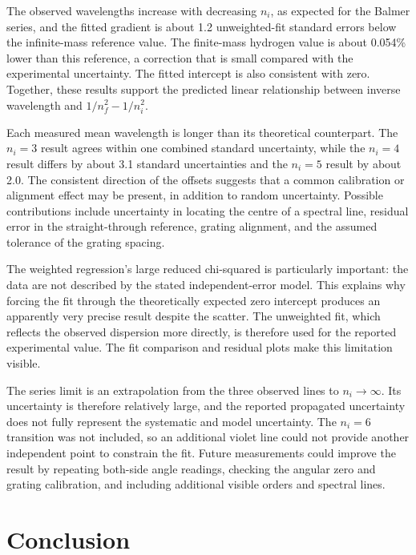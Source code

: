 \documentclass[12pt,a4paper]{article}
\begin{document}
The observed wavelengths increase with decreasing
$n_i$, as expected for the Balmer series, and the fitted
gradient is about 1.2 unweighted-fit standard errors below
the infinite-mass reference value. The finite-mass hydrogen
value is about 0.054\% lower than this reference, a correction
that is small compared with the experimental uncertainty.
The fitted intercept is also consistent with zero. Together,
these results support the predicted linear relationship
between inverse wavelength and
$1/n_f^2-1/n_i^2$.

Each measured mean wavelength is longer than its theoretical
counterpart. The $n_i=3$ result agrees within one combined
standard uncertainty, while the $n_i=4$ result differs by
about 3.1 standard uncertainties and the $n_i=5$ result by
about 2.0. The consistent direction of the offsets suggests
that a common calibration or alignment effect may be present,
in addition to random uncertainty. Possible contributions
include uncertainty in locating the centre of a spectral
line, residual error in the straight-through reference,
grating alignment, and the assumed tolerance of the grating
spacing.

The weighted regression's large reduced chi-squared is
particularly important: the data are not described by the
stated independent-error model. This explains why forcing
the fit through the theoretically expected zero intercept
produces an apparently very precise result despite the
scatter. The unweighted fit, which reflects the observed
dispersion more directly, is therefore used for the reported
experimental value. The fit comparison and residual plots
make this limitation visible.

The series limit is an extrapolation from the three observed
lines to $n_i\rightarrow\infty$. Its uncertainty is
therefore relatively large, and the reported propagated
uncertainty does not fully represent the systematic and
model uncertainty. The $n_i=6$ transition was not included,
so an additional violet line could not provide another
independent point to constrain the fit. Future measurements
could improve the result by repeating both-side angle
readings, checking the angular zero and grating calibration,
and including additional visible orders and spectral lines.

\newpage

\section{Conclusion}
\end{document}

